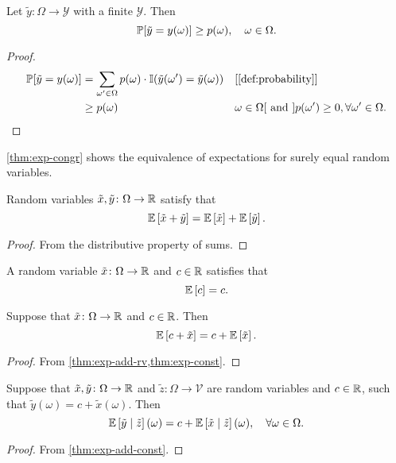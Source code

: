 \begin{lemma} \label{lem:prob-ge-measure}
  Let $\tilde{y}\colon \Omega \to \mathcal{Y}$ with a finite $\mathcal{Y}$. Then
  \[
   \mathbb{P}[\tilde{y} = y(\omega)] \ge p(\omega ), \quad \omega \in \Omega . 
  \]
\end{lemma}
\begin{proof}
 \begin{align*}
   \PP[\tilde{y} = y(\omega)]
   &= \sum_{\omega' \in \Omega } p(\omega) \cdot \I(\tilde{y}(\omega') = \tilde{y}(\omega)) && \why{\cref{def:probability}} \\
   &\ge p(\omega ) && \omega \in \Omega \why{ and } p(\omega') \ge 0, \forall \omega '\in \Omega. 
 \end{align*}
\end{proof}


\begin{remark}
\cref{thm:exp-congr} shows the equivalence of expectations for surely equal random variables. 
\end{remark}

\begin{theorem} \label{thm:exp-add-rv}
  Random variables $\tilde{x}, \tilde{y} \colon \Omega \to \mathbb{R}$ satisfy that
  \[
    \mathbb{E} \left[ \tilde{x} + \tilde{y} \right]
    =
    \mathbb{E} \left[ \tilde{x} \right] + \mathbb{E} \left[ \tilde{y} \right].
  \]
\end{theorem}
\begin{proof}
  From the distributive property of sums. 
\end{proof}

\begin{theorem} \label{thm:exp-const}
  A random variable $\tilde{x}\colon \Omega \to \mathbb{R}$ and $c\in \mathbb{R} $ satisfies that
  \[
   \mathbb{E} \left[ c \right] = c.
  \]
\end{theorem}


\begin{theorem} \label{thm:exp-add-const}
Suppose that $\tilde{x} \colon \Omega \to \mathbb{R}$ and $c\in \mathbb{R}$. Then
\[
\mathbb{E} \left[ c + \tilde{x} \right] = c + \mathbb{E} \left[ \tilde{x} \right].
\]
\end{theorem}
\begin{proof}
  From \cref{thm:exp-add-rv,thm:exp-const}.
\end{proof}


\begin{theorem} \label{thm:exp-cnd-rv-add-const}
Suppose that $\tilde{x}, \tilde{y} \colon \Omega \to \mathbb{R}$ and $\tilde{z}\colon \Omega \to \mathcal{V}$ are random variables and $c\in \mathbb{R}$, such that $\tilde{y}(\omega) = c + \tilde{x}(\omega)$. Then
\[
\mathbb{E} \left[ \tilde{y} \mid \tilde{z} \right](\omega) = c + \mathbb{E} \left[ \tilde{x} \mid  \tilde{z} \right](\omega), \quad \forall \omega \in \Omega.
\]
\end{theorem}
\begin{proof}
From \cref{thm:exp-add-const}.
\end{proof}

